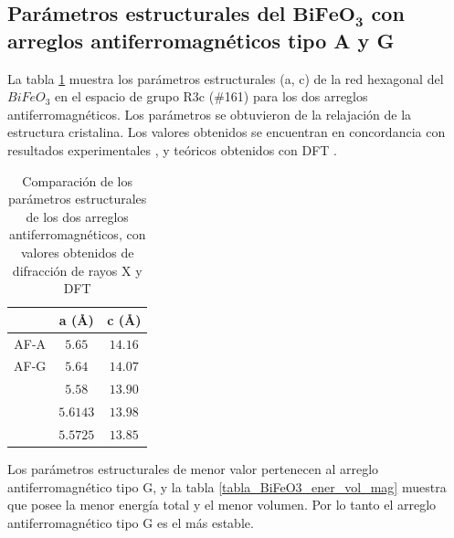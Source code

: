 \subsection{Par\'ametros estructurales del $\mathbf{BiFeO_{3}}$ con arreglos 
antiferromagn\'eticos tipo A y G}

La tabla \ref{tabla_BiFeO3_parametro_red} muestra los par\'ametros 
estructurales (a, c) de la red hexagonal del $BiFeO_{3}$ en el espacio de grupo 
R3c (\#161) para los dos arreglos antiferromagn\'eticos. Los par\'ametros se 
obtuvieron de la relajaci\'on de la estructura cristalina. Los valores 
obtenidos se encuentran en concordancia con resultados experimentales 
\cite{lu2010}, y te\'oricos obtenidos con DFT 
\cite{lee2012,arnold2015}.


\begin{table}[H]
    \begin{center}
        \caption[Par\'ametros de red optimizados del 
        $BiFeO_{3}$]{Comparaci\'on 
            de los par\'ametros estructurales de los dos arreglos 
            antiferromagn\'eticos, con valores obtenidos de 
            difracci\'on de 
            rayos X y DFT}
        \begin{tabular}{ccc}
            \hline
                 & \textbf{a (\AA)} & \textbf{c (\AA)} \\
            \hline \hline
            AF-A & $5.65$ & $14.16$ \\
            \hline
            AF-G & $5.64$ & $14.07$ \\
            \hline
            \cite{lu2010} & $5.58$ & $13.90$ \\
            \hline
            \cite{lee2012} & $5.6143$ & $13.98$ \\
            \hline
            \cite{arnold2015} & $5.5725$ & $13.85$ \\
            \hline
        \end{tabular}
        \label{tabla_BiFeO3_parametro_red}
    \end{center}
\end{table}

\noindent Los par\'ametros estructurales de menor valor pertenecen al arreglo 
antiferromagn\'etico tipo G, y la tabla 
\ref{tabla_BiFeO3_ener_vol_mag} muestra 
que 
posee la menor energ\'ia total y el menor volumen. Por lo tanto el 
arreglo 
antiferromagn\'etico tipo G es el m\'as estable.

